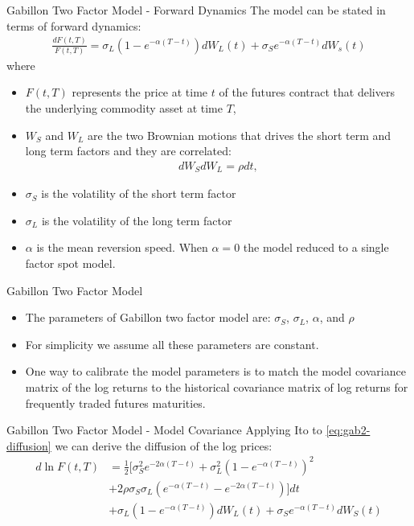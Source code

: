 \documentclass[11pt]{beamer}
\begin{document}
\begin{frame}{Gabillon Two Factor Model - Forward Dynamics}
The model can be stated in terms of forward dynamics:
\begin{align}
\frac{dF(t, T)}{F(t, T)} = \sigma_L (1 - e^{-\alpha(T-t)}) dW_L(t) + \sigma_S e^{-\alpha(T-t)} dW_s(t)
\label{eq:gab2-diffusion}
\end{align}
where 
\begin{itemize}
\item $F(t, T)$ represents the price at time $t$ of the futures contract that delivers the underlying commodity asset at time $T$,
\item $W_S$ and $W_L$ are the two Brownian motions that drives the short term and long term factors and they are correlated:
\begin{align*}
dW_S dW_L = \rho dt,
\end{align*}
\item $\sigma_S$ is the volatility of the short term factor
\item $\sigma_L$ is the volatility of the long term factor
\item $\alpha$ is the mean reversion speed. When $\alpha = 0$ the model reduced to a single factor spot model. 
\end{itemize}
\end{frame}


\begin{frame}{Gabillon Two Factor Model}
\begin{itemize}
\item The parameters of Gabillon two factor model are: $\sigma_S$, $\sigma_L$, $\alpha$, and $\rho$
\item For simplicity we assume all these parameters are constant.
\item One way to calibrate the model parameters is to match the model covariance matrix of the log returns to the historical covariance matrix of log returns for frequently traded futures maturities.
\end{itemize}

\end{frame}

\begin{frame}{Gabillon Two Factor Model - Model Covariance}
Applying Ito to \eqref{eq:gab2-diffusion} we can derive the diffusion of the log prices:
\begin{align*}
d \ln F(t, T) & = \frac{1}{2}[ \sigma_S^2 e^{-2\alpha(T-t)} + \sigma_L^2(1-e^{-\alpha(T-t)})^2 \\
              & + 2 \rho \sigma_S \sigma_L \left(e^{-\alpha(T-t)} - e^{-2\alpha(T-t)}\right)] dt\\
              & + \sigma_L(1-e^{-\alpha(T-t)}) dW_L(t) 
                + \sigma_S e^{-\alpha(T-t)} dW_S(t)
\end{align*}

\end{frame}
\end{document}
